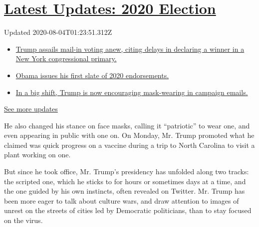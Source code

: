 \hypertarget{latest-updates-2020-election}{%
\section{\texorpdfstring{\href{https://www.nytimes.com/2020/08/03/us/elections/biden-vs-trump.html?action=click\&pgtype=Article\&state=default\&region=MAIN_CONTENT_1\&context=storylines_live_updates}{Latest
Updates: 2020
Election}}{Latest Updates: 2020 Election}}\label{latest-updates-2020-election}}

Updated 2020-08-04T01:23:51.312Z

\begin{itemize}
\tightlist
\item
  \href{https://www.nytimes.com/2020/08/03/us/elections/biden-vs-trump.html?action=click\&pgtype=Article\&state=default\&region=MAIN_CONTENT_1\&context=storylines_live_updates\#link-6494b448}{Trump
  assails mail-in voting anew, citing delays in declaring a winner in a
  New York congressional primary.}
\item
  \href{https://www.nytimes.com/2020/08/03/us/elections/biden-vs-trump.html?action=click\&pgtype=Article\&state=default\&region=MAIN_CONTENT_1\&context=storylines_live_updates\#link-3de249e6}{Obama
  issues his first slate of 2020 endorsements.}
\item
  \href{https://www.nytimes.com/2020/08/03/us/elections/biden-vs-trump.html?action=click\&pgtype=Article\&state=default\&region=MAIN_CONTENT_1\&context=storylines_live_updates\#link-54e34d20}{In
  a big shift, Trump is now encouraging mask-wearing in campaign
  emails.}
\end{itemize}

\href{https://www.nytimes.com/2020/08/03/us/elections/biden-vs-trump.html?action=click\&pgtype=Article\&state=default\&region=MAIN_CONTENT_1\&context=storylines_live_updates}{See
more updates}

He also changed his stance on face masks, calling it ``patriotic'' to
wear one, and even appearing in public with one on. On Monday, Mr. Trump
promoted what he claimed was quick progress on a vaccine during a trip
to North Carolina to visit a plant working on one.

But since he took office, Mr. Trump's presidency has unfolded along two
tracks: the scripted one, which he sticks to for hours or sometimes days
at a time, and the one guided by his own instincts, often revealed on
Twitter. Mr. Trump has been more eager to talk about culture wars, and
draw attention to images of unrest on the streets of cities led by
Democratic politicians, than to stay focused on the virus.

